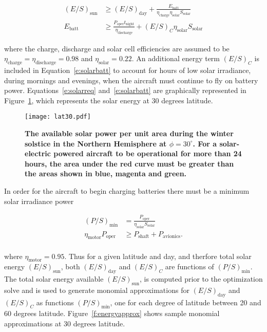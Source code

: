 \documentclass[]{aiaa-tc}%
\begin{document}
\begin{align}
    \label{e:solarreq}
    (E/S)_{\text{sun}}  &\geq (E/S)_{\text{day}} + \frac{E_{\text{batt}}}{\eta_{\text{charge}}\eta_{\text{solar}} S_{\text{solar}}} \\
    \label{e:solarbatt}
    E_{\text{batt}} &\geq \frac{P_{\text{oper}}t_{\text{night}}}{\eta_{\text{discharge}}} + (E/S)_C \eta_{\text{solar}} S_{\text{solar}}
\end{align}

where the charge, discharge and solar cell efficiencies are assumed to be $\eta_{\text{charge}} = \eta_{\text{discharge}} = 0.98$ and $\eta_{\text{solar}}= 0.22$. 
An additional energy term $(E/S)_C$ is included in Equation~\eqref{e:solarbatt} to account for hours of low solar irradiance, during mornings and evenings, when the aircraft must continue to fly on battery power. 
Equations~\eqref{e:solarreq} and~\eqref{e:solarbatt} are graphically represented in Figure~\ref{f:lat30}, which represents the solar energy at 30 degrees latitude. 

\begin{figure}[H]
	\begin{center}
	\texttt{[image: lat30.pdf]}
    \caption{\textbf{The available solar power per unit area during the winter solstice in the Northern Hemisphere at $\phi=30^{\circ}$. For a solar-electric powered aircraft to be operational for more than 24 hours, the area under the red curve must be greater than the areas shown in blue, magenta and green.}}
	\label{f:lat30}
	\end{center}
\end{figure}

In order for the aircraft to begin charging batteries there must be a minimum solar irradiance power

\begin{align}
    (P/S)_{\text{min}} &= \frac{P_{\text{oper}}}{\eta_{\text{solar}} S_{\text{solar}}} \\
    \eta_{\text{motor}} P_{\text{oper}} &\geq P_{\text{shaft}} + P_{\text{avionics}}. \\
\end{align}

where $\eta_{\text{motor}} = 0.95$. Thus for a given latitude and day, and therfore total solar energy $(E/S)_{\text{sun}}$, both $(E/S)_{\text{day}}$ and $(E/S)_C$ are functions of $(P/S)_{\text{min}}$.  
The total solar energy available $(E/S)_{\text{sun}}$, is computed prior to the optimization solve and is used to generate monomial approximations for $(E/S)_{\text{day}}$ and $(E/S)_C$ as functions $(P/S)_{\text{min}}$, one for each degree of latitude between 20 and 60 degrees latitude. 
Figure~\ref{f:energyapprox} shows sample monomial approximations at 30 degrees latitude. 
\end{document}
